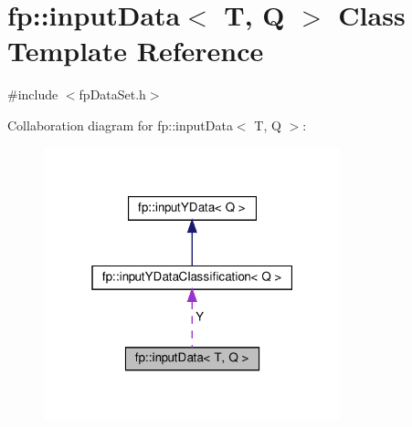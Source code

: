 \hypertarget{classfp_1_1inputData}{}\section{fp\+:\+:input\+Data$<$ T, Q $>$ Class Template Reference}
\label{classfp_1_1inputData}


{\ttfamily \#include $<$fp\+Data\+Set.\+h$>$}



Collaboration diagram for fp\+:\+:input\+Data$<$ T, Q $>$\+:
\nopagebreak
\begin{figure}[H]
\begin{center}
\leavevmode
\includegraphics[width=244pt]{classfp_1_1inputData__coll__graph}
\end{center}
\end{figure}
